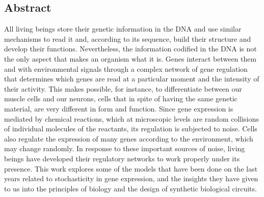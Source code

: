 \documentclass[12pt,letterpaper,twoside,openright]{report}
\begin{document}
\subsection*{Abstract}
\vspace{-0.5cm}
\begin{singlespacing}
All living beings store their genetic information in the DNA and use similar mechanisms to read it and, according to its sequence, build their structure and develop their functions. Nevertheless, the information codified in the DNA is not the only aspect that makes an organism what it is. Genes interact between them and with environmental signals through a complex network of gene regulation that determines which genes are read at a particular moment and the intensity of their activity. This makes possible, for instance, to differentiate between our muscle cells and our neurons, cells that in spite of having the same genetic material, are very different in form and function. Since gene expression is mediated by chemical reactions, which at microscopic levels are random collisions of individual molecules of the reactants, its regulation is subjected to noise. Cells also regulate the expression of many genes according to the environment, which may change randomly. In response to these important sources of noise, living beings have developed their regulatory networks to work properly under its presence. This work explores some of the models that have been done on the last years related to stochasticity in gene expression, and the insights they have given to us into the principles of biology and the design of synthetic biological circuits.\par
\end{singlespacing}
\end{document}
